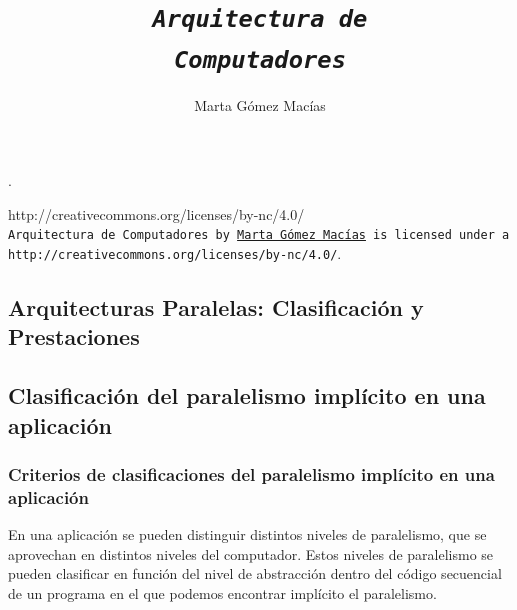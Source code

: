 \documentclass[10pt,a4paper,spanish]{report}
\title{\textcolor[rgb]{0.2,0.4,0.8}{\huge \texttt{\textit{Arquitectura de \\ Computadores}}}}
\author{\textcolor[rgb]{0.2,0.4,0.8}{Marta Gómez Macías}}
\begin{document}
\restoregeometry %
\nopagecolor%

\thispagestyle{empty}
.\\[175mm]
\begin{center}
{http://creativecommons.org/licenses/by-nc/4.0/}\\
\texttt{Arquitectura de Computadores by
\href{mailto:mgmacias95@gmail.com}{Marta Gómez Macías}
is licensed under a 
{http://creativecommons.org/licenses/by-nc/4.0/}}.
\end{center}

\tableofcontents

\textcolor[rgb]{0.2,0.4,0.8}{\chapter{Arquitecturas Paralelas: Clasificación y Prestaciones}}
\textcolor[rgb]{0.2,0.4,0.8}{\section{Clasificación del paralelismo implícito en una aplicación}}
\textcolor[rgb]{0.2,0.4,0.8}{\subsection{Criterios de clasificaciones del paralelismo implícito en una aplicación}}
En una aplicación se pueden distinguir distintos niveles de paralelismo, que se aprovechan en distintos niveles del computador. Estos niveles de paralelismo se pueden clasificar en función del nivel de abstracción dentro del código secuencial de un programa en el que podemos encontrar implícito el paralelismo.
\end{document}
